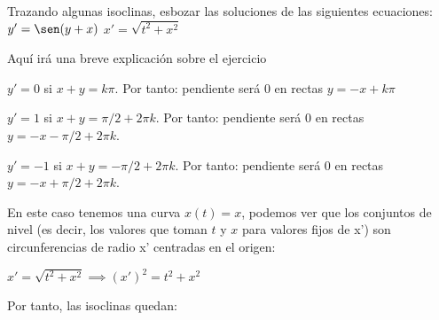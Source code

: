 \documentclass[nochap]{apuntes}
\begin{document}
\begin{problem}[5]
Trazando algunas isoclinas, esbozar las soluciones de las siguientes ecuaciones:
\ppart $y'=\sen (y+x)$
\ppart $x'= \sqrt{t^2+x^2}$

\solution

\begin{expla}
Aquí irá una breve explicación sobre el ejercicio
\end{expla}

\spart
$y'=0$ si $x+y=k\pi$. Por tanto: pendiente será 0 en rectas $y=-x+k\pi$

$y'=1$ si $x+y=\pi/2 +2\pi k$. Por tanto: pendiente será 0 en rectas $y=-x-\pi/2+2\pi k$.

$y'=-1$ si $x+y=-\pi/2 +2\pi k$. Por tanto: pendiente será 0 en rectas $y=-x+\pi/2+2\pi k$.

\newpage
\spart 
En este caso tenemos una curva $x(t)=x$, podemos ver que los conjuntos de nivel (es decir, los valores que toman $t$ y $x$ para valores fijos de x') son circunferencias de radio x' centradas en el origen:

$x'= \sqrt{t^2+x^2} \implies  (x')^2= t^2+x^2$

Por tanto, las isoclinas quedan:

\end{problem}
\newpage
\end{document}
